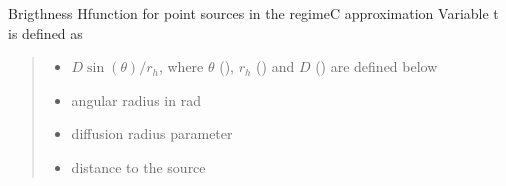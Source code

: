 \documentclass[letterpaper,10pt,english]{sphinxmanual}
\begin{document}
\begin{fulllineitems}
\label{\detokenize{diffsph.profiles:diffsph.profiles.analytics.psbrC}}
\pysigstartsignatures
{}
\pysigstopsignatures
\sphinxAtStartPar
Brigthness H\sphinxhyphen{}function for point sources in the regime\sphinxhyphen{}C approximation
Variable t is defined as
\begin{quote}\begin{description}
\begin{itemize}
\item {} 
\sphinxAtStartPar
{} \textendash{} \(D\sin(\theta)/r_h\), where \(\theta\) (), \(r_h\) () and \(D\) () are defined below

\item {} 
\sphinxAtStartPar
{} \textendash{} angular radius in rad

\item {} 
\sphinxAtStartPar
{} \textendash{} diffusion radius parameter

\item {} 
\sphinxAtStartPar
{} \textendash{} distance to the source

\end{itemize}

\end{description}\end{quote}

\end{fulllineitems}

\end{document}
